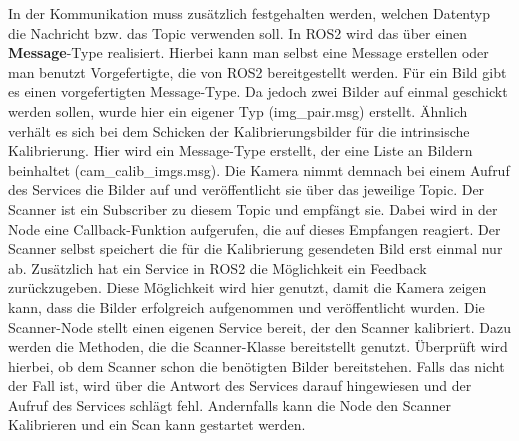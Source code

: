 		In der Kommunikation muss zusätzlich festgehalten werden, welchen Datentyp die Nachricht bzw. das Topic verwenden soll. In ROS2 wird das über einen \textbf{Message}-Type realisiert. Hierbei kann man selbst eine Message erstellen oder man benutzt Vorgefertigte, die von ROS2 bereitgestellt werden. Für ein Bild gibt es einen vorgefertigten Message-Type. Da jedoch zwei Bilder auf einmal geschickt werden sollen, wurde hier ein eigener Typ (img\_pair.msg) erstellt. Ähnlich verhält es sich bei dem Schicken der Kalibrierungsbilder für die intrinsische Kalibrierung. Hier wird ein Message-Type erstellt, der eine Liste an Bildern beinhaltet (cam\_calib\_imgs.msg). Die Kamera nimmt demnach bei einem Aufruf des Services die Bilder auf und veröffentlicht sie über das jeweilige Topic. Der Scanner ist ein Subscriber zu diesem Topic und empfängt sie. Dabei wird in der Node eine Callback-Funktion aufgerufen, die auf dieses Empfangen reagiert. Der Scanner selbst speichert die für die Kalibrierung gesendeten Bild erst einmal nur ab. Zusätzlich hat ein Service in ROS2 die Möglichkeit ein Feedback zurückzugeben. Diese Möglichkeit wird hier genutzt, damit die Kamera zeigen kann, dass die Bilder erfolgreich aufgenommen und veröffentlicht wurden.\newline
		Die Scanner-Node stellt einen eigenen Service bereit, der den Scanner kalibriert. Dazu werden die Methoden, die die Scanner-Klasse bereitstellt genutzt. Überprüft wird hierbei, ob dem Scanner schon die benötigten Bilder bereitstehen. Falls das nicht der Fall ist, wird über die Antwort des Services darauf hingewiesen und der Aufruf des Services schlägt fehl. Andernfalls kann die Node den Scanner Kalibrieren und ein Scan kann gestartet werden.
		
